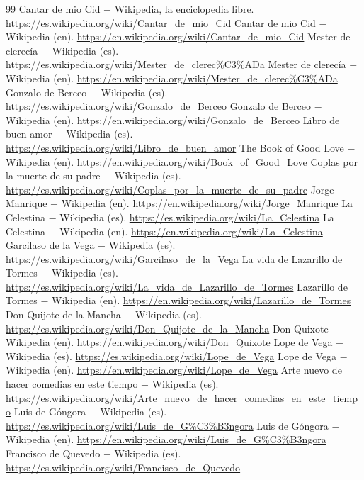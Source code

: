 \documentclass{book}
\begin{document}
\begin{thebibliography}{99}
 Cantar de mio Cid \(-\) Wikipedia, la enciclopedia libre. \url{https://es.wikipedia.org/wiki/Cantar_de_mio_Cid}
 Cantar de mio Cid \(-\) Wikipedia (en). \url{https://en.wikipedia.org/wiki/Cantar_de_mio_Cid}
 Mester de clerecía \(-\) Wikipedia (es). \url{https://es.wikipedia.org/wiki/Mester_de_clerec%C3%ADa}
 Mester de clerecía \(-\) Wikipedia (en). \url{https://en.wikipedia.org/wiki/Mester_de_clerec%C3%ADa}
 Gonzalo de Berceo \(-\) Wikipedia (es). \url{https://es.wikipedia.org/wiki/Gonzalo_de_Berceo}
 Gonzalo de Berceo \(-\) Wikipedia (en). \url{https://en.wikipedia.org/wiki/Gonzalo_de_Berceo}
 Libro de buen amor \(-\) Wikipedia (es). \url{https://es.wikipedia.org/wiki/Libro_de_buen_amor}
 The Book of Good Love \(-\) Wikipedia (en). \url{https://en.wikipedia.org/wiki/Book_of_Good_Love}
 Coplas por la muerte de su padre \(-\) Wikipedia (es). \url{https://es.wikipedia.org/wiki/Coplas_por_la_muerte_de_su_padre}
 Jorge Manrique \(-\) Wikipedia (en). \url{https://en.wikipedia.org/wiki/Jorge_Manrique}
 La Celestina \(-\) Wikipedia (es). \url{https://es.wikipedia.org/wiki/La_Celestina}
 La Celestina \(-\) Wikipedia (en). \url{https://en.wikipedia.org/wiki/La_Celestina}
 Garcilaso de la Vega \(-\) Wikipedia (es). \url{https://es.wikipedia.org/wiki/Garcilaso_de_la_Vega}
 La vida de Lazarillo de Tormes \(-\) Wikipedia (es). \url{https://es.wikipedia.org/wiki/La_vida_de_Lazarillo_de_Tormes}
 Lazarillo de Tormes \(-\) Wikipedia (en). \url{https://en.wikipedia.org/wiki/Lazarillo_de_Tormes}
 Don Quijote de la Mancha \(-\) Wikipedia (es). \url{https://es.wikipedia.org/wiki/Don_Quijote_de_la_Mancha}
 Don Quixote \(-\) Wikipedia (en). \url{https://en.wikipedia.org/wiki/Don_Quixote}
 Lope de Vega \(-\) Wikipedia (es). \url{https://es.wikipedia.org/wiki/Lope_de_Vega}
 Lope de Vega \(-\) Wikipedia (en). \url{https://en.wikipedia.org/wiki/Lope_de_Vega}
 Arte nuevo de hacer comedias en este tiempo \(-\) Wikipedia (es). \url{https://es.wikipedia.org/wiki/Arte_nuevo_de_hacer_comedias_en_este_tiempo}
 Luis de Góngora \(-\) Wikipedia (es). \url{https://es.wikipedia.org/wiki/Luis_de_G%C3%B3ngora}
 Luis de Góngora \(-\) Wikipedia (en). \url{https://en.wikipedia.org/wiki/Luis_de_G%C3%B3ngora}
 Francisco de Quevedo \(-\) Wikipedia (es). \url{https://es.wikipedia.org/wiki/Francisco_de_Quevedo}

\end{thebibliography}
\end{document}
